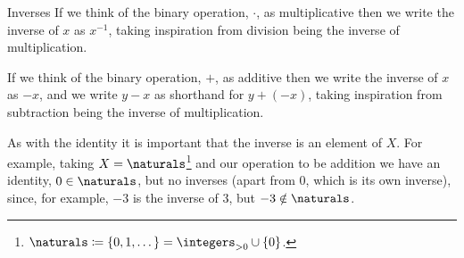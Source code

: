 \begin{ntn}{Inverses}{}
    If we think of the binary operation, \(\cdot\), as multiplicative then we write the inverse of \(x\) as \(x^{-1}\), taking inspiration from division being the inverse of multiplication.
    
    If we think of the binary operation, \(+\), as additive then we write the inverse of \(x\) as \(-x\), and we write \(y - x\) as shorthand for \(y + (-x)\), taking inspiration from subtraction being the inverse of multiplication.
\end{ntn}

As with the identity it is important that the inverse is an element of \(X\).
For example, taking \(X = \naturals\)\footnote{\(\naturals \coloneqq \{0, 1, \dotsc\} = \positiveintegers \union \{0\}\).} and our operation to be addition we have an identity, \(0 \in \naturals\), but no inverses (apart from 0, which is its own inverse), since, for example, \(-3\) is the inverse of \(3\), but \(-3 \notin \naturals\).

